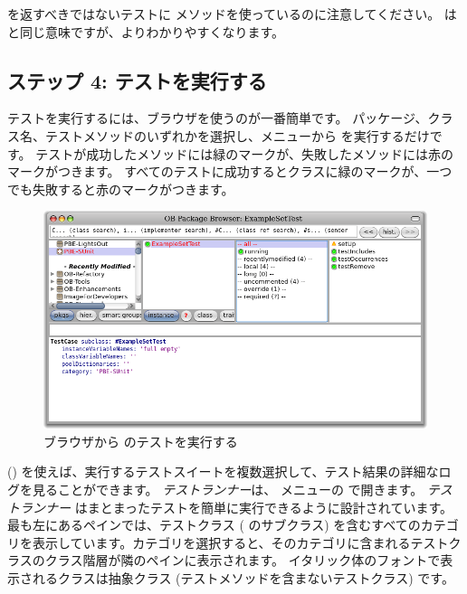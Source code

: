 \documentclass[a4paper,10pt,twoside]{book}
\begin{document}
\noindent
{} を返すべきではないテストに  メソッドを使っているのに注意してください。
 は  と同じ意味ですが、よりわかりやすくなります。

\subsection{ステップ 4: テストを実行する}

テストを実行するには、ブラウザを使うのが一番簡単です。
パッケージ、クラス名、テストメソッドのいずれかを選択し、メニューから  を実行するだけです。
テストが成功したメソッドには緑のマークが、失敗したメソッドには赤のマークがつきます。
すべてのテストに成功するとクラスに緑のマークが、一つでも失敗すると赤のマークがつきます。

\begin{figure}[tbh]
  \begin{center}
	\includegraphics[width=\linewidth]{browser-tests}
	\caption{ブラウザから \sunit のテストを実行する}
  \end{center}
\end{figure}


\sunit {} () を使えば、実行するテストスイートを複数選択して、テスト結果の詳細なログを見ることができます。
\emph{テストランナー}は、 メニューの  で開きます。
\emph{テストランナー} はまとまったテストを簡単に実行できるように設計されています。
最も左にあるペインでは、テストクラス (\ie {} のサブクラス) を含むすべてのカテゴリを表示しています。カテゴリを選択すると、そのカテゴリに含まれるテストクラスのクラス階層が隣のペインに表示されます。
イタリック体のフォントで表示されるクラスは抽象クラス (テストメソッドを含まないテストクラス) です。
\end{document}
